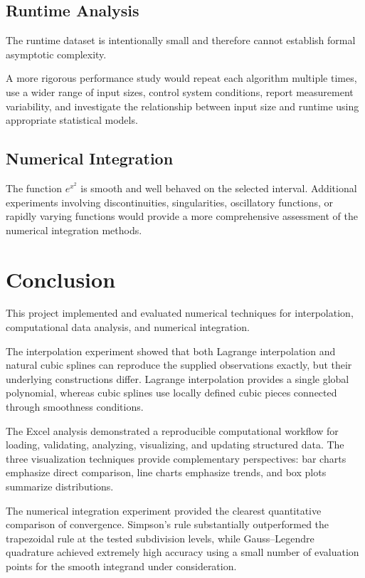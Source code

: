 \documentclass[11pt,a4paper]{article}
\begin{document}
\subsection{Runtime Analysis}

The runtime dataset is intentionally small and therefore cannot establish
formal asymptotic complexity.

A more rigorous performance study would repeat each algorithm multiple
times, use a wider range of input sizes, control system conditions, report
measurement variability, and investigate the relationship between input size
and runtime using appropriate statistical models.

\subsection{Numerical Integration}

The function $e^{x^2}$ is smooth and well behaved on the selected interval.
Additional experiments involving discontinuities, singularities,
oscillatory functions, or rapidly varying functions would provide a more
comprehensive assessment of the numerical integration methods.


\section{Conclusion}

This project implemented and evaluated numerical techniques for
interpolation, computational data analysis, and numerical integration.

The interpolation experiment showed that both Lagrange interpolation and
natural cubic splines can reproduce the supplied observations exactly, but
their underlying constructions differ. Lagrange interpolation provides a
single global polynomial, whereas cubic splines use locally defined cubic
pieces connected through smoothness conditions.

The Excel analysis demonstrated a reproducible computational workflow for
loading, validating, analyzing, visualizing, and updating structured data.
The three visualization techniques provide complementary perspectives:
bar charts emphasize direct comparison, line charts emphasize trends, and
box plots summarize distributions.

The numerical integration experiment provided the clearest quantitative
comparison of convergence. Simpson's rule substantially outperformed the
trapezoidal rule at the tested subdivision levels, while Gauss--Legendre
quadrature achieved extremely high accuracy using a small number of
evaluation points for the smooth integrand under consideration.
\end{document}
